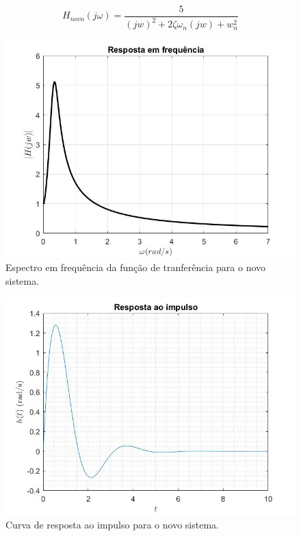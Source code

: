 \documentclass[a4paper,12pt,oneside,openany,table,xcdraw]{article}
\begin{document}
\vspace{0.3cm}
\begin{equation} \label{ex3:Hnovo}
H_{novo}(j\omega) = \dfrac{5}{(jw)^2 + 2 \zeta \omega_n (jw) + w_n ^2}
\end{equation}

\vspace{2cm}
\begin{figure}[H]
\centering
\includegraphics[width=14cm]{ex3-Hjwf}
\caption{Espectro em frequência da função de tranferência para o novo sistema.}
\label{ex3:Hjw:F}
\end{figure}

\vspace{0.2cm}
\begin{figure}[H]
\centering
\includegraphics[width=14cm]{ex3-htf}
\caption{Curva de resposta ao impulso para o novo sistema.}
\label{ex3:ht:F}
\end{figure}
\end{document}
